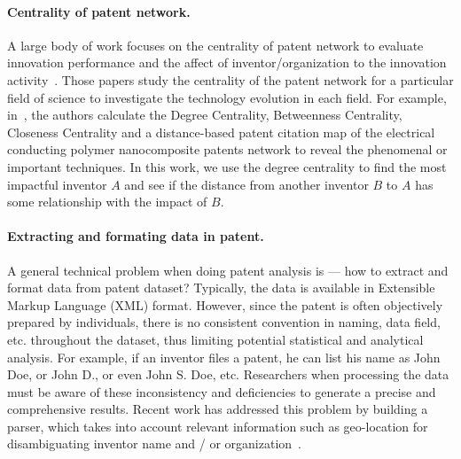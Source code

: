 \paragraph{Centrality of patent network.} A large body of work focuses on the centrality 
of patent network to evaluate innovation performance and the affect of inventor/organization to the innovation activity~\cite{Kim2013944, aktamov, Lee2010}. Those papers study the centrality of the patent network for a particular field of science to investigate the technology evolution in each field. For example, in~\cite{Lee2010}, the authors calculate the Degree Centrality, Betweenness Centrality, Closeness Centrality and  a distance-based patent citation map of the electrical conducting polymer nanocomposite patents network to reveal the phenomenal or important techniques. In this work,  we use the degree centrality to find the most impactful inventor $A$ and see if the distance from another inventor $B$ to $A$ has some relationship with the impact of $B$. 

\paragraph{Extracting and formating data in patent.}  A general technical
problem when doing patent analysis is --- how to extract and format data from
patent dataset? Typically, the data is available in Extensible Markup
Language (XML) format. However, since the patent is often objectively prepared
by individuals, there is no consistent convention in naming, data field,
etc. throughout the dataset, thus limiting potential statistical and
analytical analysis. For example, if an inventor files a patent, he can 
list his name as John Doe, or John D., or even John S. Doe, etc. Researchers when
processing the data must be aware of these inconsistency and deficiencies to
generate a precise and comprehensive results. Recent work has addressed this
problem by building a parser, which takes into account relevant information 
such as geo-location for disambiguating inventor name and / or organization~\cite{formattingpatentdata,
disambiguation, Torvik:2009}. 
